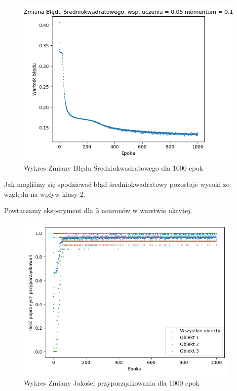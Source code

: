 \documentclass[12pt]{article}
\begin{document}
\begin{figure}[!htb]
 \centering
 \includegraphics[width=12cm]{WykresBlad1neuron4wejscia.png}
 \caption{Wykres Zmiany Błędu Średniokwadratowego dla 1000 epok}
 \vspace{-0.1cm}
 \label{WykresBlad1}
\end{figure}

Jak mogliśmy się spodziewać błąd średniokwadratowy pozostaje wysoki ze względu na wpływ klasy 2.


\newpage

Powtarzamy eksperyment dla 3 neuronów w warstwie ukrytej.

\begin{figure}[!htb]
 \centering
 \includegraphics[width=11cm]{WykresPrzyporzadkowania3neuron4wejscia.png}
 \caption{Wykres Zmiany Jakości przyporządkowania dla 1000 epok}
 \vspace{-0.1cm}
 \label{WykresPrzyp2}
\end{figure}
\end{document}
